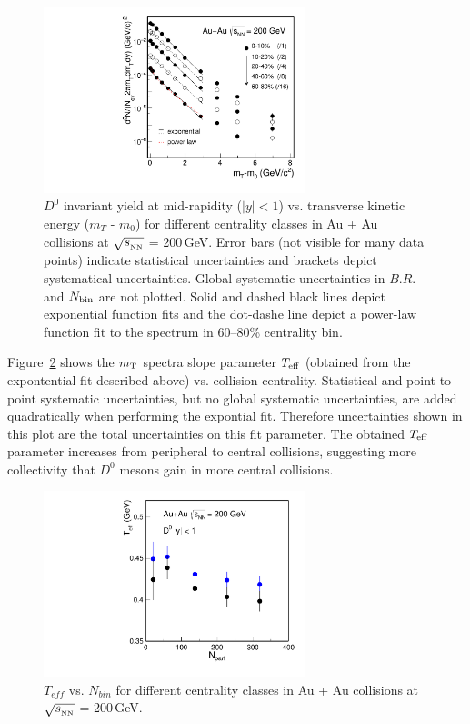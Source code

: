 \begin{figure}
\centering
\includegraphics[width=0.68\textwidth]{figure/Run14_D0HFT/mTFit_D0.pdf}
\caption{$D^{0}$ invariant yield at mid-rapidity ($|y|<1$) vs. transverse kinetic energy ($m_{T}$ - $m_{0}$) for different centrality classes in Au + Au collisions at $\sqrt{s_{_{\rm NN}}}$ = 200\,GeV. Error bars (not visible for many data points) indicate statistical uncertainties and brackets depict systematical uncertainties. Global systematic uncertainties in $B.R.$ and $N_{\rm bin}$ are not plotted. Solid and dashed black lines depict exponential function fits and the dot-dashe line depict a power-law function fit to the spectrum in 60--80\% centrality bin.}
\label{mTFit_D0} 
\end{figure}

Figure~\ref{Teff_D0} shows the $m_{\rm T}$ spectra slope parameter $T_{\rm eff}$ (obtained from the expontential fit described above) vs. collision centrality. Statistical and point-to-point systematic uncertainties, but no global systematic uncertainties, are added quadratically when performing the expontial fit. Therefore uncertainties shown in this plot are the total uncertainties on this fit parameter. The obtained $T_{\rm eff}$ parameter increases from peripheral to central collisions, suggesting more collectivity that $D^0$ mesons gain in more central collisions. 

\begin{figure}
\centering
\includegraphics[width=0.68\textwidth]{figure/Run14_D0HFT/Teff_D0.pdf}
\caption{$T_{eff}$ vs. $N_{bin}$ for different centrality classes in Au + Au collisions at $\sqrt{s_{_{\rm NN}}}$ = 200\,GeV.}
\label{Teff_D0} 
\end{figure}


